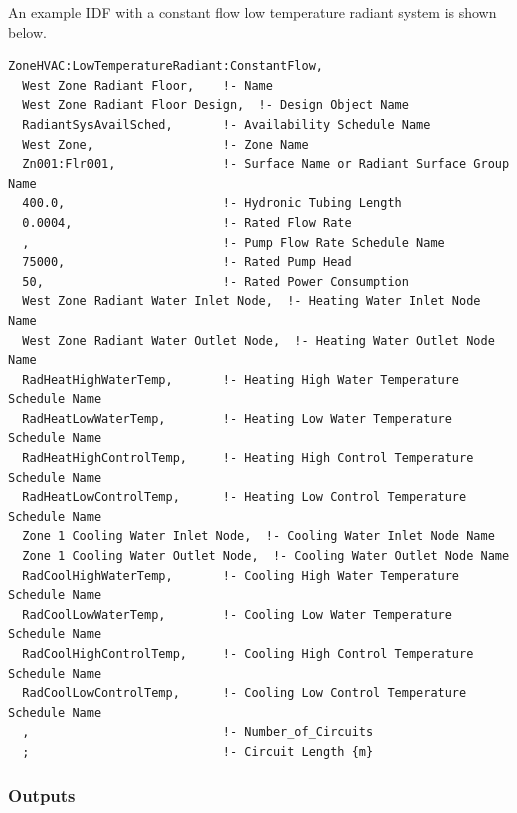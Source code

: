 An example IDF with a constant flow low temperature radiant system is shown below.

\begin{lstlisting}
ZoneHVAC:LowTemperatureRadiant:ConstantFlow,
  West Zone Radiant Floor,    !- Name
  West Zone Radiant Floor Design,  !- Design Object Name
  RadiantSysAvailSched,       !- Availability Schedule Name
  West Zone,                  !- Zone Name
  Zn001:Flr001,               !- Surface Name or Radiant Surface Group Name
  400.0,                      !- Hydronic Tubing Length
  0.0004,                     !- Rated Flow Rate
  ,                           !- Pump Flow Rate Schedule Name
  75000,                      !- Rated Pump Head
  50,                         !- Rated Power Consumption
  West Zone Radiant Water Inlet Node,  !- Heating Water Inlet Node Name
  West Zone Radiant Water Outlet Node,  !- Heating Water Outlet Node Name
  RadHeatHighWaterTemp,       !- Heating High Water Temperature Schedule Name
  RadHeatLowWaterTemp,        !- Heating Low Water Temperature Schedule Name
  RadHeatHighControlTemp,     !- Heating High Control Temperature Schedule Name
  RadHeatLowControlTemp,      !- Heating Low Control Temperature Schedule Name
  Zone 1 Cooling Water Inlet Node,  !- Cooling Water Inlet Node Name
  Zone 1 Cooling Water Outlet Node,  !- Cooling Water Outlet Node Name
  RadCoolHighWaterTemp,       !- Cooling High Water Temperature Schedule Name
  RadCoolLowWaterTemp,        !- Cooling Low Water Temperature Schedule Name
  RadCoolHighControlTemp,     !- Cooling High Control Temperature Schedule Name
  RadCoolLowControlTemp,      !- Cooling Low Control Temperature Schedule Name
  ,                           !- Number_of_Circuits
  ;                           !- Circuit Length {m}
\end{lstlisting}


\subsubsection{Outputs}\label{outputs-6-007}

